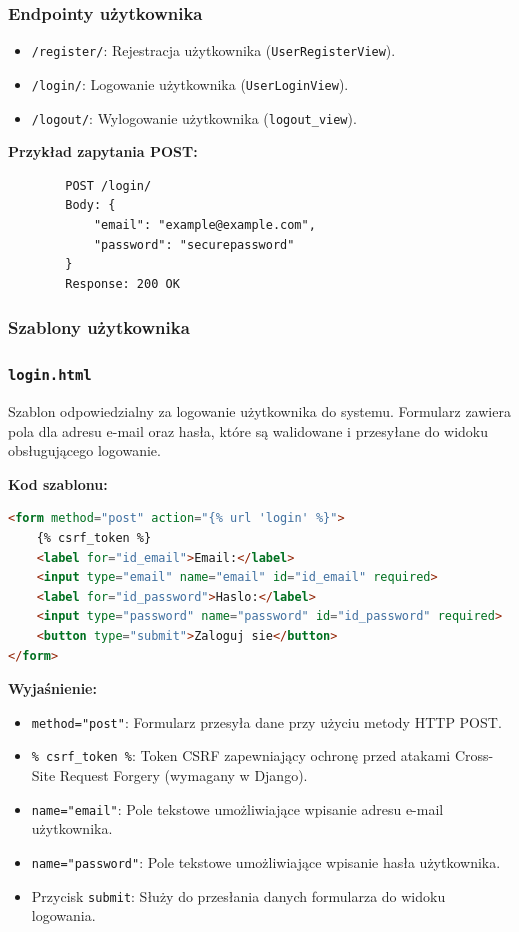 \documentclass[12pt,a4paper,oneside]{article}
\theoremstyle{definition}
\numberwithin{equation}{section}
\begin{document}
\subsubsection{Endpointy użytkownika}

\begin{itemize}
    \item \texttt{/register/}: Rejestracja użytkownika (\texttt{UserRegisterView}).
    \item \texttt{/login/}: Logowanie użytkownika (\texttt{UserLoginView}).
    \item \texttt{/logout/}: Wylogowanie użytkownika (\texttt{logout\_view}).
\end{itemize}

\textbf{Przykład zapytania POST:}
\begin{verbatim}
        POST /login/
        Body: {
            "email": "example@example.com",
            "password": "securepassword"
        }
        Response: 200 OK
\end{verbatim}
\subsubsection{Szablony użytkownika}

\subsubsection*{\texttt{login.html}}
\label{sec:login_template}

Szablon odpowiedzialny za logowanie użytkownika do systemu. Formularz zawiera pola dla adresu e-mail oraz hasła, które są walidowane i przesyłane do widoku obsługującego logowanie. 

\textbf{Kod szablonu:}
\begin{lstlisting}[language=HTML, caption=Szablon login.html]
<form method="post" action="{% url 'login' %}">
    {% csrf_token %}
    <label for="id_email">Email:</label>
    <input type="email" name="email" id="id_email" required>
    <label for="id_password">Haslo:</label>
    <input type="password" name="password" id="id_password" required>
    <button type="submit">Zaloguj sie</button>
</form>
\end{lstlisting}

\textbf{Wyjaśnienie:}
\begin{itemize}
    \item \texttt{method="post"}: Formularz przesyła dane przy użyciu metody HTTP POST.
    \item \texttt{{\% csrf\_token \%}}: Token CSRF zapewniający ochronę przed atakami Cross-Site Request Forgery (wymagany w Django).
    \item \texttt{name="email"}: Pole tekstowe umożliwiające wpisanie adresu e-mail użytkownika.
    \item \texttt{name="password"}: Pole tekstowe umożliwiające wpisanie hasła użytkownika.
    \item Przycisk \texttt{submit}: Służy do przesłania danych formularza do widoku logowania.
\end{itemize}
\end{document}
